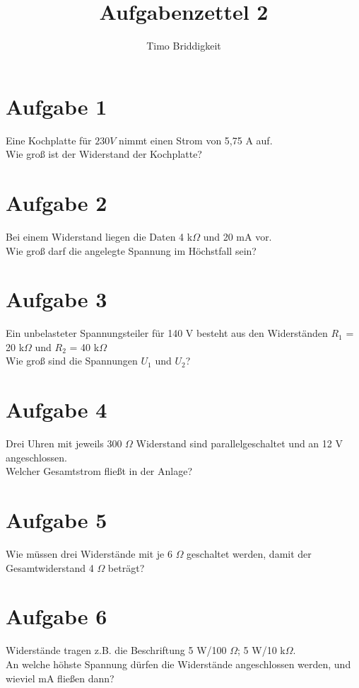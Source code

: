 \documentclass[a4paper, 11pt]{article}
\begin{document}
\title{Aufgabenzettel 2}
\author{Timo Briddigkeit}


\newpage

\section*{Aufgabe 1}
Eine Kochplatte für $230 V$ nimmt einen Strom von 5,75 A auf.\\
Wie groß ist der Widerstand der Kochplatte?

\section*{Aufgabe 2}
Bei einem Widerstand liegen die Daten 4 k$\Omega$ und 20 mA vor.\\
Wie groß darf die angelegte Spannung im Höchstfall sein?

\section*{Aufgabe 3}
Ein unbelasteter Spannungsteiler für 140 V besteht aus den Widerständen $R_{1}$ = 20 k$\Omega$ und $R_{2}$ = 40 k$\Omega$\\
Wie groß sind die Spannungen $U_{1}$ und $U_{2}$?

\section*{Aufgabe 4}
Drei Uhren mit jeweils 300 $\Omega$ Widerstand sind parallelgeschaltet und an 12 V angeschlossen.\\
Welcher Gesamtstrom fließt in der Anlage?

\section*{Aufgabe 5}
Wie müssen drei Widerstände mit je 6 $\Omega$ geschaltet werden, damit der Gesamtwiderstand 4 $\Omega$ beträgt?

\section*{Aufgabe 6}
Widerstände tragen z.B. die Beschriftung 5 W/100 $\Omega$; 5 W/10 k$\Omega$.\\
An welche höhste Spannung dürfen die Widerstände angeschlossen werden, und wieviel mA fließen dann?
\end{document}
